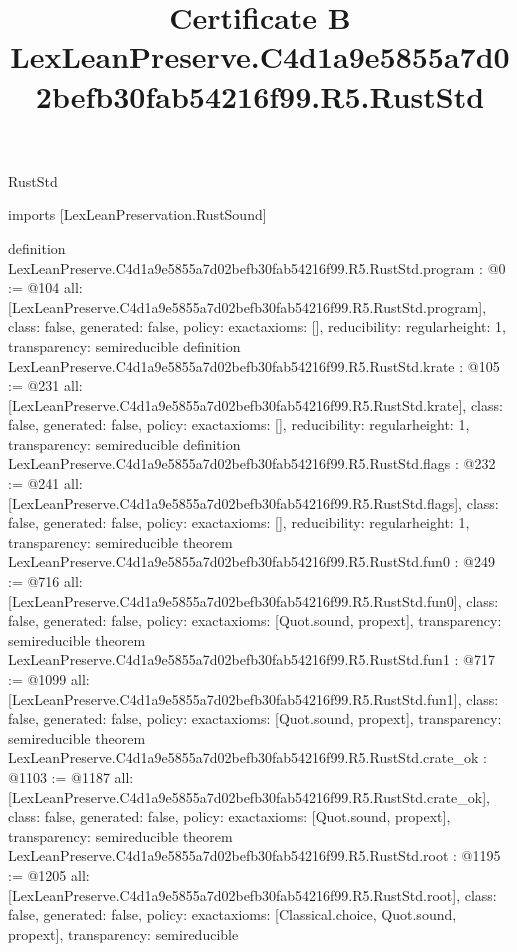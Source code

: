 \begin{lexlean}{RustStd}
\title{Certificate B LexLeanPreserve.C4d1a9e5855a7d02befb30fab54216f99.R5.RustStd}
\begin{coremodule}
imports [LexLeanPreservation.RustSound]

definition LexLeanPreserve.C4d1a9e5855a7d02befb30fab54216f99.R5.RustStd.program : @0 := @104 {
  all: [LexLeanPreserve.C4d1a9e5855a7d02befb30fab54216f99.R5.RustStd.program],
  class: false,
  generated: false,
  policy: exact{axioms: []},
  reducibility: regular{height: 1},
  transparency: semireducible
}
definition LexLeanPreserve.C4d1a9e5855a7d02befb30fab54216f99.R5.RustStd.krate : @105 := @231 {
  all: [LexLeanPreserve.C4d1a9e5855a7d02befb30fab54216f99.R5.RustStd.krate],
  class: false,
  generated: false,
  policy: exact{axioms: []},
  reducibility: regular{height: 1},
  transparency: semireducible
}
definition LexLeanPreserve.C4d1a9e5855a7d02befb30fab54216f99.R5.RustStd.flags : @232 := @241 {
  all: [LexLeanPreserve.C4d1a9e5855a7d02befb30fab54216f99.R5.RustStd.flags],
  class: false,
  generated: false,
  policy: exact{axioms: []},
  reducibility: regular{height: 1},
  transparency: semireducible
}
theorem LexLeanPreserve.C4d1a9e5855a7d02befb30fab54216f99.R5.RustStd.fun0 : @249 := @716 {
  all: [LexLeanPreserve.C4d1a9e5855a7d02befb30fab54216f99.R5.RustStd.fun0],
  class: false,
  generated: false,
  policy: exact{axioms: [Quot.sound, propext]},
  transparency: semireducible
}
theorem LexLeanPreserve.C4d1a9e5855a7d02befb30fab54216f99.R5.RustStd.fun1 : @717 := @1099 {
  all: [LexLeanPreserve.C4d1a9e5855a7d02befb30fab54216f99.R5.RustStd.fun1],
  class: false,
  generated: false,
  policy: exact{axioms: [Quot.sound, propext]},
  transparency: semireducible
}
theorem LexLeanPreserve.C4d1a9e5855a7d02befb30fab54216f99.R5.RustStd.crate_ok : @1103 := @1187 {
  all: [LexLeanPreserve.C4d1a9e5855a7d02befb30fab54216f99.R5.RustStd.crate_ok],
  class: false,
  generated: false,
  policy: exact{axioms: [Quot.sound, propext]},
  transparency: semireducible
}
theorem LexLeanPreserve.C4d1a9e5855a7d02befb30fab54216f99.R5.RustStd.root : @1195 := @1205 {
  all: [LexLeanPreserve.C4d1a9e5855a7d02befb30fab54216f99.R5.RustStd.root],
  class: false,
  generated: false,
  policy: exact{axioms: [Classical.choice, Quot.sound, propext]},
  transparency: semireducible
}


\end{coremodule}
\end{lexlean}
